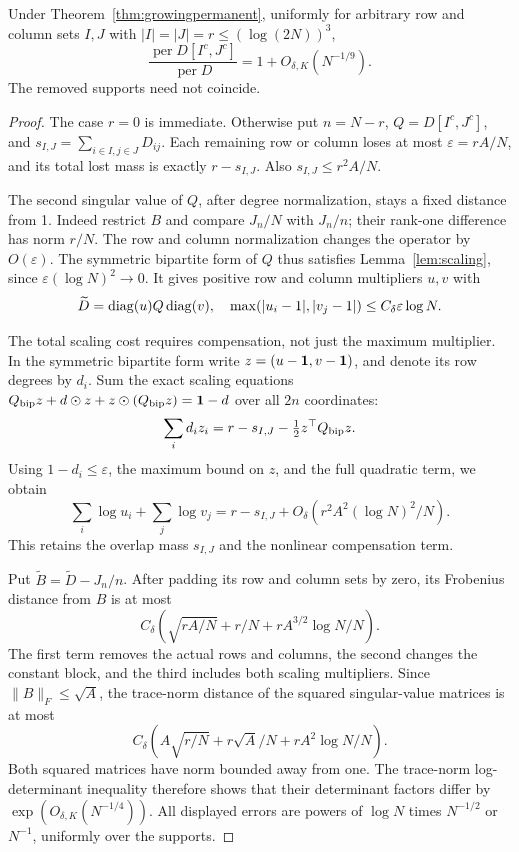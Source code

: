 \begin{lemma}
\label{lem:relativecompensatedminors}
Under Theorem~\ref{thm:growingpermanent}, uniformly for arbitrary
row and column sets \(I,J\) with
\(|I|=|J|=r\leq(\log(2N))^3\),
\[
 \frac{\operatorname{per}D[I^c,J^c]}{\operatorname{per}D}
                  =1+O_{\delta,K}(N^{-1/9}).
\]
The removed supports need not coincide.
\end{lemma}
\begin{proof}
The case \(r=0\) is immediate. Otherwise put
\(n=N-r\), \(Q=D[I^c,J^c]\), and
\(s_{I,J}=\sum_{i\in I,j\in J}D_{ij}\).
Each remaining row or column loses at most
\(\varepsilon=rA/N\), and its total lost mass is exactly
\(r-s_{I,J}\). Also \(s_{I,J}\leq r^2A/N\).

The second singular value of \(Q\), after degree normalization,
stays a fixed distance from 1.
Indeed restrict \(B\) and compare \(J_n/N\) with \(J_n/n\);
their rank-one difference has norm \(r/N\).
The row and column normalization changes the operator by
\(O(\varepsilon)\).
The symmetric bipartite form of \(Q\) thus satisfies
Lemma~\ref{lem:scaling}, since
\(\varepsilon(\log N)^2\to0\).
It gives positive row and column multipliers \(u,v\) with
\[
 \widetilde D=\operatorname{diag}(u)Q\operatorname{diag}(v),\quad
 \max(|u_i-1|,|v_j-1|)
                     \leq C_\delta\varepsilon\log N.
\]

The total scaling cost requires compensation, not just
the maximum multiplier. In the symmetric bipartite form
write \(z=(u-\mathbf1,v-\mathbf1)\), and denote its row degrees by \(d_i\).
Sum the exact scaling equations
\(Q_{\rm bip}z+d\mathbin{\odot}z+
 z\mathbin{\odot}(Q_{\rm bip}z)=\mathbf1-d\)
over all \(2n\) coordinates:
\[
 \sum_i d_i z_i
       =r-s_{I,J}-\tfrac12 z^\top Q_{\rm bip}z .
\]
Using \(1-d_i\leq\varepsilon\), the maximum bound on \(z\),
and the full quadratic term, we obtain
\[
 \sum_i\log u_i+\sum_j\log v_j
 =r-s_{I,J}
        +O_\delta(r^2A^2(\log N)^2/N).
\]
This retains the overlap mass \(s_{I,J}\) and the nonlinear
compensation term.

Put \(\widetilde B=\widetilde D-J_n/n\).
After padding its row and column sets by zero, its Frobenius
distance from \(B\) is at most
\[
 C_\delta\left(\sqrt{rA/N}+r/N+
                     rA^{3/2}\log N/N\right).
\]
The first term removes the actual rows and columns, the
second changes the constant block, and the third includes
both scaling multipliers.
Since \(\|B\|_F\leq\sqrt A\), the trace-norm distance of the
squared singular-value matrices is at most
\[
 C_\delta\left(A\sqrt{r/N}+r\sqrt A/N+
                                      rA^2\log N/N\right).
\]
Both squared matrices have norm bounded away from one.
The trace-norm log-determinant inequality therefore shows
that their determinant factors differ by
\(\exp(O_{\delta,K}(N^{-1/4}))\).
All displayed errors are powers of \(\log N\) times \(N^{-1/2}\)
or \(N^{-1}\), uniformly over the supports.


\end{proof}

